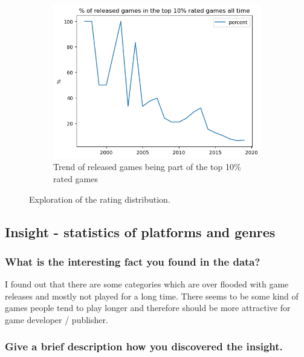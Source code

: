 \documentclass[11pt]{article}
\begin{document}
\begin{figure}
\begin{subfigure}[b]{0.475\textwidth}
        \centering
        \includegraphics[width=1\textwidth]{graphics/insight2_graph3.png}
        \caption{Trend of released games being part of the top 10\% rated games}
        \label{fig:insight2_3}
    \end{subfigure}
    \label{fig:insight2}
    \caption{Exploration of the rating distribution.}
\end{figure}

\subsection{Insight - statistics of platforms and genres}

\subsubsection{What is the interesting fact you found in the data?}

I found out that there are some categories which are over flooded with game releases and mostly not played for a long time. There seems to be some kind of games people tend to play longer and therefore should be more attractive for game developer / publisher. 

\subsubsection{Give a brief description how you discovered the
insight.}
\end{document}
